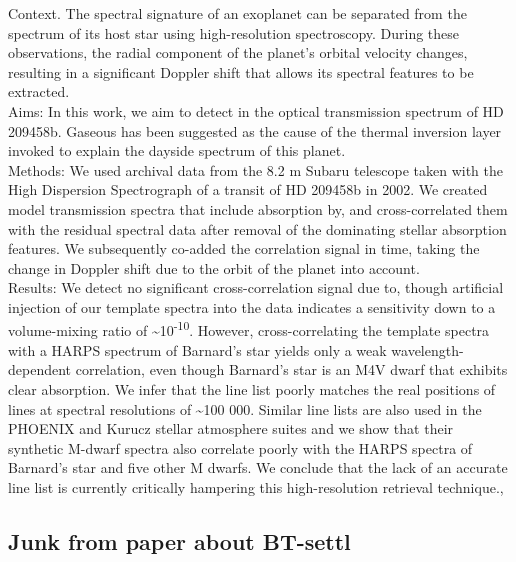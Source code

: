 





\citet{hoeijmakers_search_2015}
{Context.
    The spectral signature of an exoplanet can be separated from the spectrum of its host star using high-resolution spectroscopy.
    During these observations, the radial component of the planet's orbital velocity changes, resulting in a significant Doppler shift that allows its spectral features to be extracted.\\
    Aims: In this work, we aim to detect in the optical transmission spectrum of HD 209458b.
    Gaseous has been suggested as the cause of the thermal inversion layer invoked to explain the dayside spectrum of this planet.\\
    Methods: We used archival data from the 8.2 m Subaru telescope taken with the High Dispersion Spectrograph of a transit of HD 209458b in 2002.
    We created model transmission spectra that include absorption by, and cross-correlated them with the residual spectral data after removal of the dominating stellar absorption features.
    We subsequently co-added the correlation signal in time, taking the change in Doppler shift due to the orbit of the planet into account.\\
    Results: We detect no significant cross-correlation signal due to, though artificial injection of our template spectra into the data indicates a sensitivity down to a volume-mixing ratio of \textasciitilde{}10\textsuperscript{-10}.
    However, cross-correlating the template spectra with a {HARPS} spectrum of Barnard's star yields only a weak wavelength-dependent correlation, even though Barnard's star is an M4V dwarf that exhibits clear  absorption.
    We infer that the line list poorly matches the real positions of lines at spectral resolutions of \textasciitilde{}100 000.
    Similar line lists are also used in the {PHOENIX} and Kurucz stellar atmosphere suites and we show that their synthetic M-dwarf spectra also correlate poorly with the {HARPS} spectra of Barnard's star and five other M dwarfs.
    We conclude that the lack of an accurate line list is currently critically hampering this high-resolution retrieval technique.},




\subsection{Junk from paper about BT-settl}

